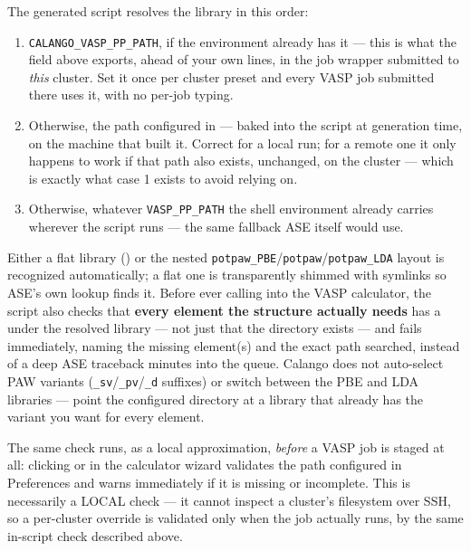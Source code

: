 The generated script resolves the library in this order:

\begin{enumerate}
  \item \texttt{CALANGO\_VASP\_PP\_PATH}, if the environment already has
    it --- this is what the  field above exports,
    ahead of your own  lines, in the job wrapper submitted to
    \emph{this} cluster. Set it once per cluster preset and every VASP job
    submitted there uses it, with no per-job typing.
  \item Otherwise, the path configured in \menusep
    \menusep{} --- baked
    into the script at generation time, on the machine that built it.
    Correct for a local run; for a remote one it only happens to work if
    that path also exists, unchanged, on the cluster --- which is exactly
    what case 1 exists to avoid relying on.
  \item Otherwise, whatever \texttt{VASP\_PP\_PATH} the shell environment
    already carries wherever the script runs --- the same fallback ASE
    itself would use.
\end{enumerate}

Either a flat library () or the nested
\texttt{potpaw\_PBE}/\texttt{potpaw}/\texttt{potpaw\_LDA} layout is
recognized automatically; a flat one is transparently shimmed with symlinks
so ASE's own lookup finds it. Before ever calling into the VASP calculator,
the script also checks that \textbf{every element the structure actually
needs} has a  under the resolved library --- not just that
the directory exists --- and fails immediately, naming the missing
element(s) and the exact path searched, instead of a deep ASE traceback
minutes into the queue. Calango does not auto-select PAW variants
(\texttt{\_sv}/\texttt{\_pv}/\texttt{\_d} suffixes) or switch between the
PBE and LDA libraries --- point the configured directory at a library that
already has the variant you want for every element.

\begin{calnote}
The same check runs, as a local approximation, \emph{before} a VASP job is
staged at all: clicking  or  in the
calculator wizard validates the path configured in Preferences and warns
immediately if it is missing or incomplete. This is necessarily a LOCAL
check --- it cannot inspect a cluster's filesystem over SSH, so a
per-cluster  override is validated only when the job
actually runs, by the same in-script check described above.
\end{calnote}

